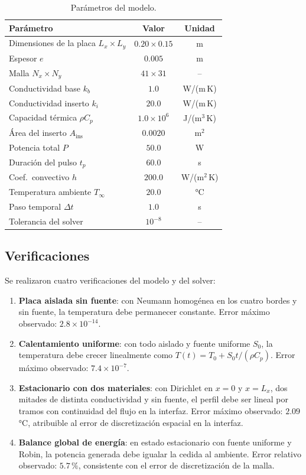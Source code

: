 \documentclass[11pt,a4paper]{article}
\begin{document}
\begin{table}[h]
\centering
\begin{tabular}{lcc}
\toprule
Parámetro & Valor & Unidad \\
\midrule
Dimensiones de la placa $L_x \times L_y$ & $0.20 \times 0.15$ & m \\
Espesor $e$ & $0.005$ & m \\
Malla $N_x \times N_y$ & $41 \times 31$ & -- \\
Conductividad base $k_b$ & $1.0$ & W/(m\,K) \\
Conductividad inserto $k_i$ & $20.0$ & W/(m\,K) \\
Capacidad térmica $\rho C_p$ & $1.0\times10^6$ & J/(m$^3$\,K) \\
Área del inserto $A_{\text{ins}}$ & $0.0020$ & m$^2$ \\
Potencia total $P$ & $50.0$ & W \\
Duración del pulso $t_p$ & $60.0$ & s \\
Coef.\ convectivo $h$ & $200.0$ & W/(m$^2$\,K) \\
Temperatura ambiente $T_\infty$ & $20.0$ & °C \\
Paso temporal $\Delta t$ & $1.0$ & s \\
Tolerancia del solver & $10^{-8}$ & -- \\
\bottomrule
\end{tabular}
\caption{Parámetros del modelo.}
\label{tab:parametros}
\end{table}

\subsection{Verificaciones}

Se realizaron cuatro verificaciones del modelo y del solver:
\begin{enumerate}
\item \textbf{Placa aislada sin fuente}: con Neumann homogénea en los cuatro bordes y sin fuente, la temperatura debe permanecer constante. Error máximo observado: $2.8\times10^{-14}$.
\item \textbf{Calentamiento uniforme}: con todo aislado y fuente uniforme $S_0$, la temperatura debe crecer linealmente como $T(t) = T_0 + S_0 t/(\rho C_p)$. Error máximo observado: $7.4\times10^{-7}$.
\item \textbf{Estacionario con dos materiales}: con Dirichlet en $x=0$ y $x=L_x$, dos mitades de distinta conductividad y sin fuente, el perfil debe ser lineal por tramos con continuidad del flujo en la interfaz. Error máximo observado: $2.09$\,°C, atribuible al error de discretización espacial en la interfaz.
\item \textbf{Balance global de energía}: en estado estacionario con fuente uniforme y Robin, la potencia generada debe igualar la cedida al ambiente. Error relativo observado: $5.7\,\%$, consistente con el error de discretización de la malla.
\end{enumerate}
\end{document}
